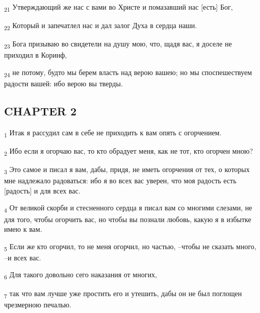 \begin{tcolorbox}
\textsubscript{21} Утверждающий же нас с вами во Христе и помазавший нас [есть] Бог,
\end{tcolorbox}
\begin{tcolorbox}
\textsubscript{22} Который и запечатлел нас и дал залог Духа в сердца наши.
\end{tcolorbox}
\begin{tcolorbox}
\textsubscript{23} Бога призываю во свидетели на душу мою, что, щадя вас, я доселе не приходил в Коринф,
\end{tcolorbox}
\begin{tcolorbox}
\textsubscript{24} не потому, будто мы берем власть над верою вашею; но мы споспешествуем радости вашей: ибо верою вы тверды.
\end{tcolorbox}
\subsection{CHAPTER 2}
\begin{tcolorbox}
\textsubscript{1} Итак я рассудил сам в себе не приходить к вам опять с огорчением.
\end{tcolorbox}
\begin{tcolorbox}
\textsubscript{2} Ибо если я огорчаю вас, то кто обрадует меня, как не тот, кто огорчен мною?
\end{tcolorbox}
\begin{tcolorbox}
\textsubscript{3} Это самое и писал я вам, дабы, придя, не иметь огорчения от тех, о которых мне надлежало радоваться: ибо я во всех вас уверен, что моя радость есть [радость] и для всех вас.
\end{tcolorbox}
\begin{tcolorbox}
\textsubscript{4} От великой скорби и стесненного сердца я писал вам со многими слезами, не для того, чтобы огорчить вас, но чтобы вы познали любовь, какую я в избытке имею к вам.
\end{tcolorbox}
\begin{tcolorbox}
\textsubscript{5} Если же кто огорчил, то не меня огорчил, но частью, --чтобы не сказать много, --и всех вас.
\end{tcolorbox}
\begin{tcolorbox}
\textsubscript{6} Для такого довольно сего наказания от многих,
\end{tcolorbox}
\begin{tcolorbox}
\textsubscript{7} так что вам лучше уже простить его и утешить, дабы он не был поглощен чрезмерною печалью.
\end{tcolorbox}
